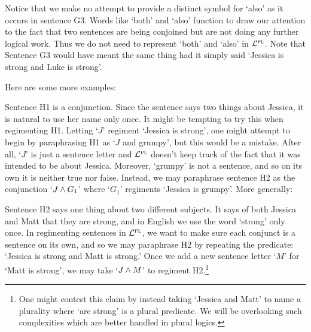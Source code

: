 Notice that we make no attempt to provide a distinct symbol for `also' as it occurs in sentence G3.
Words like `both' and `also' function to draw our attention to the fact that two sentences are being conjoined but are not doing any further logical work.
Thus we do not need to represent `both' and `also' in $\mathcal{L}^{\textsc{pl}}$.
Note that Sentence G3 would have meant the same thing had it simply said `Jessica is strong and Luke is strong'.

Here are some more examples:

\begin{earg}
\end{earg}

Sentence H1 is a conjunction.
Since the sentence says two things about Jessica, it is natural to use her name only once.
It might be tempting to try this when regimenting H1.
Letting `$J$' regiment `Jessica is strong', one might attempt to begin by paraphrasing H1 as `$J$ and grumpy', but this would be a mistake.
After all, `$J$' is just a sentence letter and $\mathcal{L}^{\textsc{pl}}$ doesn't keep track of the fact that it was intended to be about Jessica.
Moreover, `grumpy' is not a sentence, and so on its own it is neither true nor false.
Instead, we may paraphrase sentence H2 as the conjunction `$J \wedge G_{1}$' where `$G_{1}$' regiments `Jessica is grumpy'.
More generally:


Sentence H2 says one thing about two different subjects.
It says of both Jessica and Matt that they are strong, and in English we use the word `strong' only once.
In regimenting sentences in $\mathcal{L}^{\textsc{pl}}$, we want to make sure each conjunct is a sentence on its own, and so we may paraphrase H2 by repeating the predicate: `Jessica is strong and Matt is strong.'
Once we add a new sentence letter `$M$' for `Matt is strong', we may take `$J\wedge M$' to regiment H2.\footnote{One might contest this claim by instead taking `Jessica and Matt' to name a plurality where `are strong' is a plural predicate. We will be overlooking such complexities which are better handled in plural logics.}

